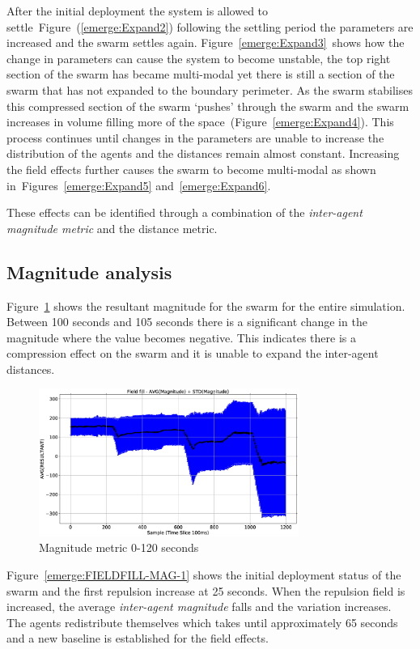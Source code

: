 \documentclass[10pt,journal,letterpaper,twoside]{IEEEtran}
\begin{document}
After the initial deployment the system is allowed to settle~Figure~(\ref{emerge:Expand2}) following the settling period the parameters are increased and the swarm settles again. Figure~\ref{emerge:Expand3}~shows how the change in parameters can cause the system to become unstable, the top right section of the swarm has became multi-modal yet there is still a section of the swarm that has not expanded to the boundary perimeter. As the swarm stabilises this compressed section of the swarm `pushes' through the swarm and the swarm increases in volume filling more of the space~(Figure~\ref{emerge:Expand4}). This process continues until changes in the parameters are unable to increase the distribution of the agents and the distances remain almost constant. Increasing the field effects further causes the swarm to become multi-modal as shown in~Figures~\ref{emerge:Expand5} and~\ref{emerge:Expand6}.

These effects can be identified through a combination of the \textit{inter-agent magnitude metric} and the distance metric.

\subsection{Magnitude analysis}
Figure~\ref{emerge:FIELDFILL-MAG} shows the resultant magnitude for the swarm for the entire simulation. Between 100 seconds and 105 seconds there is a significant change in the magnitude where the value becomes negative. This indicates there is a compression effect on the swarm and it is unable to expand the inter-agent distances.

\begin{figure}
\begin{center}
\includegraphics[width=8.5cm]{figures/FIELDFILL-MAG}
\end{center}
\caption{Magnitude metric 0-120 seconds\label{emerge:FIELDFILL-MAG}}
\end{figure}

Figure~\ref{emerge:FIELDFILL-MAG-1} shows the initial deployment status of the swarm and the first repulsion increase at 25 seconds. When the repulsion field is increased, the average \textit{inter-agent magnitude} falls and the variation increases. The agents redistribute themselves which takes until approximately 65 seconds and a new baseline is established for the field effects.
\end{document}
